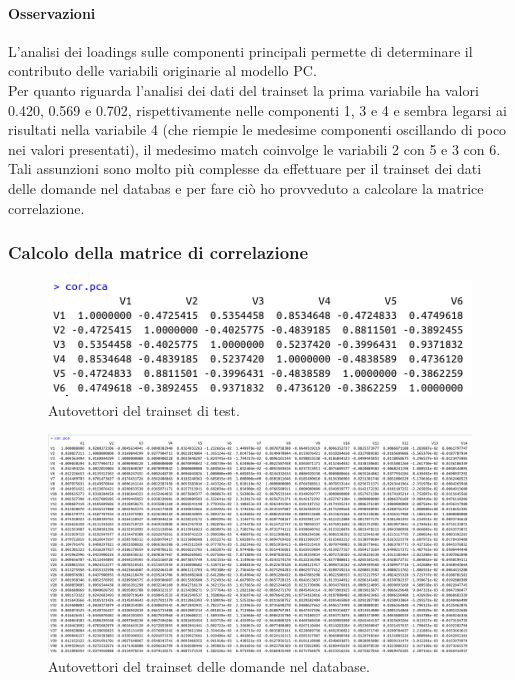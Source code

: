 \paragraph{Osservazioni}
L'analisi dei loadings sulle componenti principali permette di determinare il contributo delle variabili originarie al modello PC.\\
Per quanto riguarda l'analisi dei dati del trainset  la prima variabile ha valori  0.420, 0.569 e 0.702,  rispettivamente nelle componenti 1, 3 e 4 e sembra legarsi ai risultati nella variabile 4 (che riempie le medesime componenti oscillando di poco nei valori presentati), il medesimo match coinvolge le variabili 2 con 5 e 3 con 6.\\
Tali assunzioni sono molto pi\`u complesse da effettuare per  il trainset dei dati delle domande nel databas e  per fare ci\`o ho provveduto a calcolare la matrice correlazione.

\subsubsection{Calcolo della matrice di correlazione}
\label{Calcolo della matrice di correlazione}

\begin{figure}[H]
\centering
	\includegraphics[width=0.60\linewidth]{../../PCA/plot/correlazione_rete-prova.png}
	\caption{Autovettori del trainset di test.}
\end{figure}

\begin{figure}[H]
\centering
	\includegraphics[width=1\linewidth]{../../PCA/plot/correlazione_rete-db.png}
	\caption{Autovettori del trainset delle domande nel database.}
\end{figure}
\noindent


